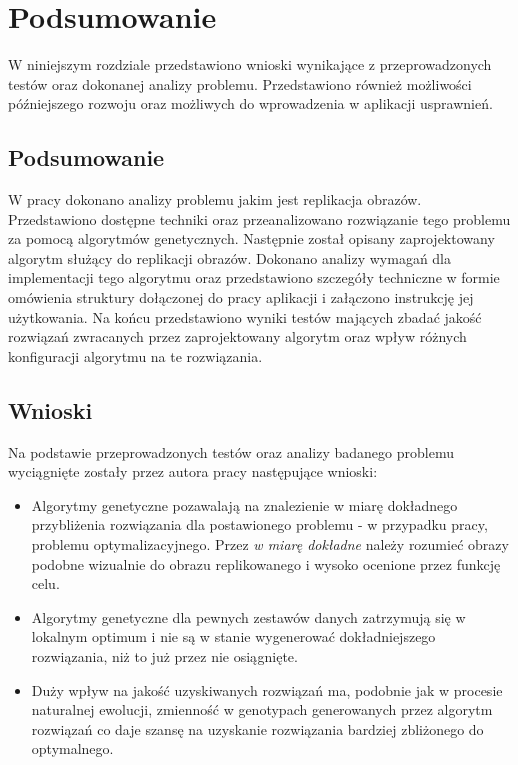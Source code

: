 \chapter{Podsumowanie}
\thispagestyle{chapterBeginStyle}
\label{podsumowanie}

W niniejszym rozdziale przedstawiono wnioski wynikające z przeprowadzonych testów oraz dokonanej analizy problemu. Przedstawiono również możliwości późniejszego rozwoju oraz możliwych do wprowadzenia w aplikacji usprawnień.

\section{Podsumowanie}
W pracy dokonano analizy problemu jakim jest replikacja obrazów. Przedstawiono dostępne techniki oraz przeanalizowano rozwiązanie tego problemu za pomocą algorytmów genetycznych. Następnie został opisany zaprojektowany algorytm służący do replikacji obrazów. Dokonano analizy wymagań dla implementacji tego algorytmu oraz przedstawiono szczegóły techniczne w formie omówienia struktury dołączonej do pracy aplikacji i załączono instrukcję jej użytkowania. Na końcu przedstawiono wyniki testów mających zbadać jakość rozwiązań zwracanych przez zaprojektowany algorytm oraz wpływ różnych konfiguracji algorytmu na te rozwiązania.   

\section{Wnioski}
Na podstawie przeprowadzonych testów oraz analizy badanego problemu wyciągnięte zostały przez autora pracy następujące wnioski:
\begin{itemize}
    \item Algorytmy genetyczne pozawalają na znalezienie w miarę dokładnego przybliżenia rozwiązania dla postawionego problemu - w przypadku pracy, problemu optymalizacyjnego. Przez \textit{w miarę dokładne} należy rozumieć obrazy podobne wizualnie do obrazu replikowanego i wysoko ocenione przez funkcję celu.
    \item Algorytmy genetyczne dla pewnych zestawów danych zatrzymują się w lokalnym optimum i nie są w stanie wygenerować dokładniejszego rozwiązania, niż to już przez nie osiągnięte.
    \item Duży wpływ na jakość uzyskiwanych rozwiązań ma, podobnie jak w procesie naturalnej ewolucji, zmienność w genotypach generowanych przez algorytm rozwiązań co daje szansę na uzyskanie rozwiązania bardziej zbliżonego do optymalnego.
\end{itemize}

